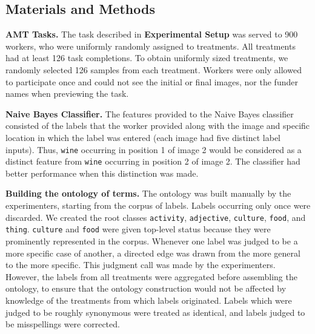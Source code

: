 \documentclass[a4paper]{report}
\begin{document}
\subsection*{Materials and Methods}

\textbf{AMT Tasks.} The task described in \textbf{Experimental Setup}
was served to 900 workers, who were uniformly randomly assigned to
treatments.  All treatments had at least 126 task completions.  To obtain 
uniformly sized treatments, we randomly selected 126 samples from each 
treatment. Workers were
only allowed to participate once and could not see the initial or final 
images, nor the funder names when previewing the task.

\textbf{Naive Bayes Classifier.}
The features provided to the Naive Bayes classifier consisted of the labels
that the worker provided along with the image and specific location in which 
the label was entered
(each image had five distinct label inputs).  Thus, \texttt{wine} occurring in 
position 1 of image 2 would be considered as a distinct feature from 
\texttt{wine} occurring in position 2 of image 2. The classifier 
had better performance when this distinction was made.

\textbf{Building the ontology of terms.}  The ontology was built manually
by the experimenters, starting from the corpus of labels. Labels occurring only 
once were discarded.  We created the root classes \texttt{activity}, 
\texttt{adjective}, \texttt{culture}, 
\texttt{food}, and \texttt{thing}. \texttt{culture} and \texttt{food} were 
given top-level status because they were prominently represented in the corpus.
Whenever one label was judged to be a more specific case of another, a
directed edge was drawn from the more general to the more specific. This
judgment call was made by the experimenters.  However, the labels from all 
treatments were aggregated before assembling the ontology,  to 
ensure that the ontology construction would not be affected by 
knowledge of the treatments from which labels originated. 
Labels which were judged to be roughly synonymous were treated as identical,
and labels judged to be misspellings were corrected. 
\end{document}
